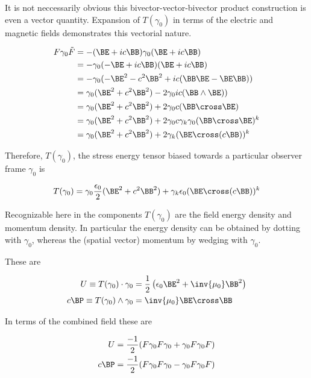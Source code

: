 \documentclass[]{eliblog}
\begin{document}
It is not neccessarily obvious this bivector-vector-bivector product construction is even a vector quantity.
Expansion of $T(\gamma_0)$ in terms of
the electric and magnetic fields
demonstrates this vectorial nature.

\begin{align*}
F \gamma_0 \tilde{F}
&=
-(\BE + i c \BB) \gamma_0 (\BE + i c \BB) \\
&=
-\gamma_0 (-\BE + i c \BB) (\BE + i c \BB) \\
&=
-\gamma_0 (-\BE^2 - c^2 \BB^2 + i c (\BB \BE - \BE \BB) ) \\
&=
\gamma_0 (\BE^2 + c^2 \BB^2) - 2 \gamma_0 i c (\BB \wedge \BE) ) \\
&=
\gamma_0 (\BE^2 + c^2 \BB^2) + 2 \gamma_0 c (\BB \cross \BE) \\
&=
\gamma_0 (\BE^2 + c^2 \BB^2) + 2 \gamma_0 c \gamma_k \gamma_0 (\BB \cross \BE)^k \\
&=
\gamma_0 (\BE^2 + c^2 \BB^2) + 2 \gamma_k (\BE \cross (c \BB))^k \\
\end{align*}

Therefore, $T(\gamma_0)$, the stress energy tensor biased towards a particular observer frame $\gamma_0$
is

\begin{align}
T(\gamma_0)
&=
\gamma_0 \frac{\epsilon_0}{2} (\BE^2 + c^2 \BB^2) + \gamma_k \epsilon_0 (\BE \cross (c \BB))^k \\
\end{align}

Recognizable here in the components $T(\gamma_0)$ are the field energy density and momentum density.  In particular
the energy density can be obtained by dotting with $\gamma_0$, whereas the (spatial vector) momentum by wedging with
$\gamma_0$.

These are

\begin{align}
U \equiv T(\gamma_0) \cdot \gamma_0 &= \frac{1}{2} \left( \epsilon_0 \BE^2 + \inv{\mu_0} \BB^2 \right) \\
c \BP \equiv T(\gamma_0) \wedge \gamma_0 &= \inv{\mu_0} \BE \cross \BB
\end{align}

In terms of the combined field these are

\begin{align}
U &= \frac{-1}{2}( F \gamma_0 F \gamma_0 + \gamma_0 F \gamma_0 F) \\
c \BP &= \frac{-1}{2}( F \gamma_0 F \gamma_0 - \gamma_0 F \gamma_0 F)
\end{align}
\end{document}
